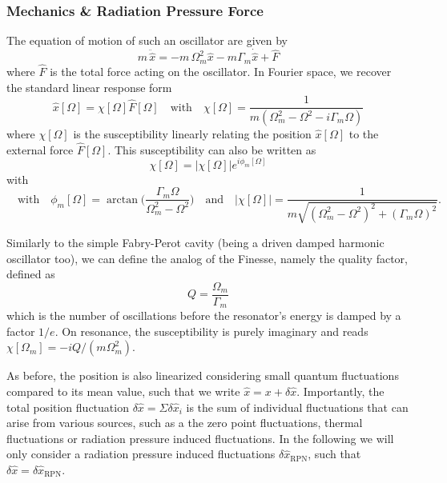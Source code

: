 \subsubsection{Mechanics \& Radiation Pressure Force }
The equation of motion of such an oscillator are given by 
\begin{equation}
  m \, \ddot{\hat x} = -m \, \Omega_m^2 \hat x - m \Gamma_m \dot{\hat x} + \hat F
\end{equation}
where $\hat F$ is the total force acting on the oscillator.
In Fourier space, we recover the standard linear response form
\begin{equation}
  \hat x [\Omega] = \chi[\Omega] \hat F[\Omega] \quad \text{with} \quad \chi[\Omega] = \frac{1}{m(\Omega_m^2 - \Omega^2 - i \Gamma_m \Omega)}
\end{equation}
where $\chi[\Omega]$ is the susceptibility linearly relating the position $\hat x [\Omega]$ to the external force $\hat F[\Omega]$. This susceptibility can also be written as 
\begin{equation}
  \chi[\Omega] = |\chi[\Omega]| e^{i \phi_m[\Omega]}
\end{equation}
with 
\begin{equation*}  
  \quad \text{with} \quad \phi_m[\Omega] = \arctan\Big(\frac{\Gamma_m \Omega}{\Omega_m^2 - \Omega^2}\Big) \quad \text{and} \quad |\chi[\Omega]| = \frac{1}{m\sqrt{(\Omega_m^2 - \Omega^2)^2 + (\Gamma_m \Omega)^2}}.
\end{equation*}


Similarly to the simple Fabry-Perot cavity (being a driven damped harmonic oscillator too), we can define the analog of the Finesse, namely the quality factor, defined as 
\begin{equation}
  Q = \frac{\Omega_m}{\Gamma_m}
\end{equation}
which is the number of oscillations before the resonator's energy is damped by a factor $1/e$. On resonance, the susceptibility is purely imaginary and reads $\chi[\Omega_m] = -i Q/(m \Omega_m^2)$. 

As before, the position is also linearized considering small quantum fluctuations compared to its mean value, such that we write $\hat{x}= x + \delta \hat{x}$. Importantly, the total position fluctuation $\delta \hat{x} = \Sigma \delta \hat{x}_i$ is the sum of individual fluctuations that can arise from various sources, such as a the zero point fluctuations, thermal fluctuations or radiation pressure induced fluctuations. In the following we will only consider a radiation pressure induced fluctuations $\delta \hat{x}_{\mathrm{RPN}}$, such that $\delta \hat{x} =  \delta \hat{x}_{\mathrm{RPN}}$. 

